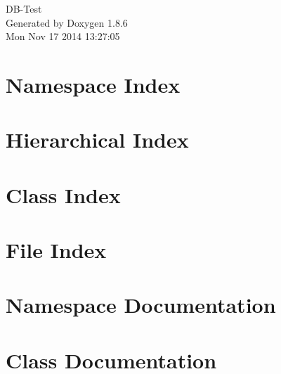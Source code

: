 \documentclass[twoside]{book}
\newcommand{\clearemptydoublepage}{%
  \newpage{\pagestyle{empty}\cleardoublepage}%
}
\begin{document}
\hypersetup{pageanchor=false}
\begin{titlepage}
\vspace*{7cm}
\begin{center}%
{\Large D\-B-\/\-Test }\\
\vspace*{1cm}
{\large Generated by Doxygen 1.8.6}\\
\vspace*{0.5cm}
{\small Mon Nov 17 2014 13:27:05}\\
\end{center}
\end{titlepage}
\clearemptydoublepage
\tableofcontents
\clearemptydoublepage
{}
\hypersetup{pageanchor=true}

\chapter{Namespace Index}

\chapter{Hierarchical Index}

\chapter{Class Index}

\chapter{File Index}

\chapter{Namespace Documentation}


\chapter{Class Documentation}


















\end{document}
